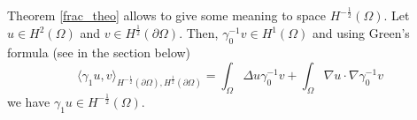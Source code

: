 
Theorem \ref{frac_theo} allows to give some meaning to space \(H^{-\frac{1}{2}}(\Omega)\). Let \(u \in H^2(\Omega)\) and \(v \in H^\frac{1}{2}(\partial\Omega)\). Then, \(\gamma_0^{-1}v \in H^1(\Omega)\) and using Green's formula (see in the section below)
\[
    \langle \gamma_1 u, v \rangle_{H^{-\frac{1}{2}}(\partial\Omega), H^{\frac{1}{2}}(\partial\Omega)} = \int_\Omega \Delta u \gamma_0^{-1}v + \int_\Omega \nabla u \cdot \nabla \gamma_0^{-1}v
\]
we have \(\gamma_1 u \in H^{-\frac{1}{2}}(\Omega)\).

